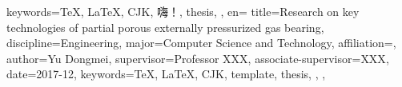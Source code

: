 {{{      keywords={\TeX, \LaTeX, CJK, 嗨！, thesis},
    },
    en={
      title={Research on key technologies of partial porous externally pressurized gas bearing},
      discipline={Engineering},
      major={Computer Science and Technology},
      affiliation={},
      author={Yu Dongmei},
      supervisor={Professor XXX},
      associate-supervisor={XXX},
      date={2017-12},
      keywords={\TeX, \LaTeX, CJK, template, thesis},
    },
  },
}
